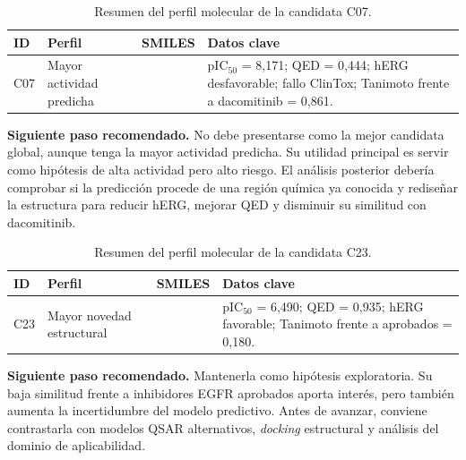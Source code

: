 \documentclass[IB]{TFUOC}%
\begin{document}
\vspace{0.35cm}

\begin{samepage}
\begin{table}[H]
    \centering
    \small
    \renewcommand{\arraystretch}{1.25}
    \begin{tabularx}{\textwidth}{p{1cm} p{3cm} Y p{4cm}}
        \hline
        \textbf{ID} & \textbf{Perfil} & \textbf{SMILES} & \textbf{Datos clave} \\
        \hline
        C07 &
        Mayor actividad predicha &
        \texttt{} &
        pIC$_{50}$ = 8,171; QED = 0,444; hERG desfavorable; fallo ClinTox; Tanimoto frente a dacomitinib = 0,861. \\
        \hline
    \end{tabularx}
    \caption{Resumen del perfil molecular de la candidata C07.}
    \label{tab:perfil_c07}
\end{table}

\noindent\textbf{Siguiente paso recomendado.}
No debe presentarse como la mejor candidata global, aunque tenga la mayor actividad predicha. Su utilidad principal es servir como hipótesis de alta actividad pero alto riesgo. El análisis posterior debería comprobar si la predicción procede de una región química ya conocida y rediseñar la estructura para reducir hERG, mejorar QED y disminuir su similitud con dacomitinib.
\end{samepage}

\vspace{0.35cm}

\begin{samepage}
\begin{table}[H]
    \centering
    \small
    \renewcommand{\arraystretch}{1.25}
    \begin{tabularx}{\textwidth}{p{1cm} p{3cm} Y p{4cm}}
        \hline
        \textbf{ID} & \textbf{Perfil} & \textbf{SMILES} & \textbf{Datos clave} \\
        \hline
        C23 &
        Mayor novedad estructural &
        \texttt{} &
        pIC$_{50}$ = 6,490; QED = 0,935; hERG favorable; Tanimoto frente a aprobados = 0,180. \\
        \hline
    \end{tabularx}
    \caption{Resumen del perfil molecular de la candidata C23.}
    \label{tab:perfil_c23}
\end{table}

\noindent\textbf{Siguiente paso recomendado.}
Mantenerla como hipótesis exploratoria. Su baja similitud frente a inhibidores EGFR aprobados aporta interés, pero también aumenta la incertidumbre del modelo predictivo. Antes de avanzar, conviene contrastarla con modelos QSAR alternativos, \textit{docking} estructural y análisis del dominio de aplicabilidad.
\end{samepage}
\end{document}
